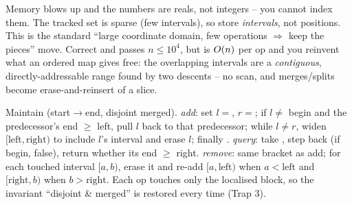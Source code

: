 \begin{thinkbox}
{Memory blows up and the numbers are reals, not integers -- you cannot index them. The tracked set is
sparse (few intervals), so store \emph{intervals}, not positions. This is the standard ``large
coordinate domain, few operations $\Rightarrow$ keep the pieces'' move.}
{Correct and passes $n\le10^{4}$, but is $O(n)$ per op and you reinvent what an ordered map gives
free: the overlapping intervals are a \emph{contiguous}, directly-addressable range found by two
 descents -- no scan, and merges/splits become erase-and-reinsert of a slice.}
\end{thinkbox}

Maintain  (start$\to$end, disjoint merged). \emph{add}: set $l=$,
$r=$; if $l\ne$ begin and the predecessor's end $\ge$ left, pull $l$ back to
that predecessor; while $l\ne r$, widen $[\text{left},\text{right})$ to include $l$'s interval and erase
$l$; finally . \emph{query}: take , step back (if begin,
false), return whether its end $\ge$ right. \emph{remove}: same bracket as add; for each touched
interval $[a,b)$, erase it and re-add $[a,\text{left})$ when $a<\text{left}$ and $[\text{right},b)$ when
$b>\text{right}$. Each op touches only the localised block, so the invariant ``disjoint \& merged''
is restored every time (Trap 3).

